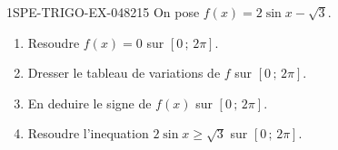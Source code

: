 \begin{exercice}{1SPE-TRIGO-EX-048}{2}{15}
On pose $f(x) = 2\sin x - \sqrt{3}$.
\begin{enumerate}
  \item Resoudre $f(x) = 0$ sur $[0\,;\,2\pi]$.
  \item Dresser le tableau de variations de $f$ sur $[0\,;\,2\pi]$.
  \item En deduire le signe de $f(x)$ sur $[0\,;\,2\pi]$.
  \item Resoudre l'inequation $2\sin x \geqslant \sqrt{3}$ sur $[0\,;\,2\pi]$.
\end{enumerate}
\end{exercice}
